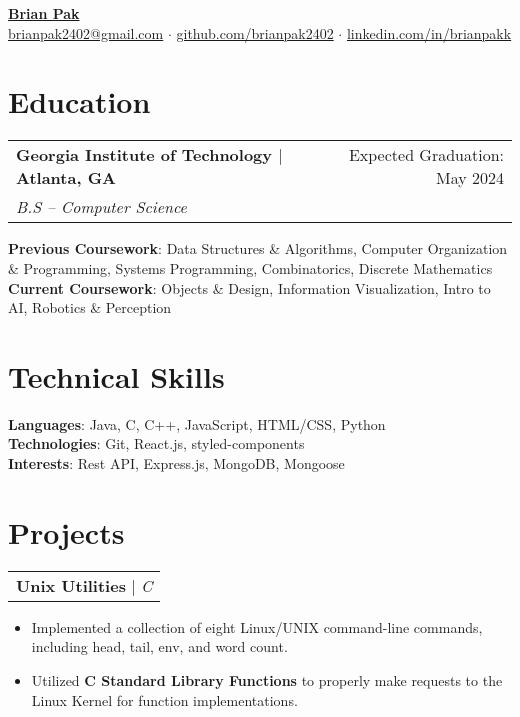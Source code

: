 \documentclass[letterpaper,11pt]{article}
\makeatletter
\newcommand{\resumeEducationHeading}[4]{
    \begin{tabular*}{0.99\textwidth}[t]{l@{\extracolsep{\fill}}r}
      \textbf{#1} & #2 \\
      \textit{\small#3} & \textit{\small #4} \\
    \end{tabular*}\vspace{0.5pt}
}
\newcommand{\resumeProjectHeading}[2]{
    \begin{tabular*}{0.97\textwidth}[t]{l@{\extracolsep{\fill}}}
      \textbf{#1} $\vert$ \textit{#2} 
    \end{tabular*}\vspace{-4pt}
}
\newcommand{\resumeItemListStart}{\begin{itemize}[noitemsep]\vspace{-4pt}}
\newcommand{\resumeItemListEnd}{\end{itemize}}
\makeatother
\begin{document}
\begin{center}
  \textbf{\href{https://www.linkedin.com/in/brianpakk/}{\huge Brian Pak}} \\
  \vspace*{0.1cm}
   \href{mailto:brianpak2402@gmail.com}{brianpak2402@gmail.com}  $\cdot$  \href{https://github.com/brianpak2402}{github.com/brianpak2402} $\cdot$  \href{https://www.linkedin.com/in/brianpakk/}{linkedin.com/in/brianpakk}  
\end{center}

\section{Education}
    \resumeEducationHeading
      {Georgia Institute of Technology $\vert$ Atlanta, GA}{Expected Graduation: May 2024}
      {B.S -- Computer Science}{\vspace{0.1cm} } 
    \textbf{Previous Coursework}{: Data Structures \& Algorithms, Computer Organization \& Programming, Systems Programming, Combinatorics, Discrete Mathematics} \\
    \textbf{Current Coursework}{: Objects \& Design, Information Visualization, Intro to AI, Robotics \& Perception}

\section{Technical Skills}
    \textbf{Languages}{: Java, C, C++, JavaScript, HTML/CSS, Python} \\
    \textbf{Technologies}{: Git, React.js, styled-components} \\
    \textbf{Interests}{: Rest API, Express.js, MongoDB, Mongoose}

\section{Projects}
    \resumeProjectHeading{Unix Utilities}{C}
      \resumeItemListStart
        \item {Implemented a collection of eight Linux/UNIX command-line commands, including head, tail, env, and word count.}
        \item {Utilized \textbf{C Standard Library Functions} to properly make requests to the Linux Kernel for function implementations.}
      \resumeItemListEnd
\end{document}
